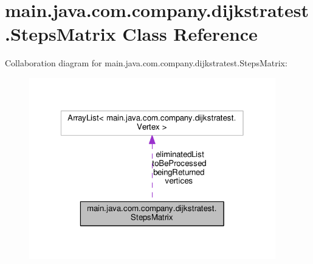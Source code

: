 \hypertarget{classmain_1_1java_1_1com_1_1company_1_1dijkstratest_1_1_steps_matrix}{\section{main.\-java.\-com.\-company.\-dijkstratest.\-Steps\-Matrix Class Reference}
\label{classmain_1_1java_1_1com_1_1company_1_1dijkstratest_1_1_steps_matrix}
}


Collaboration diagram for main.\-java.\-com.\-company.\-dijkstratest.\-Steps\-Matrix\-:
\nopagebreak
\begin{figure}[H]
\begin{center}
\leavevmode
\includegraphics[width=304pt]{classmain_1_1java_1_1com_1_1company_1_1dijkstratest_1_1_steps_matrix__coll__graph}
\end{center}
\end{figure}
